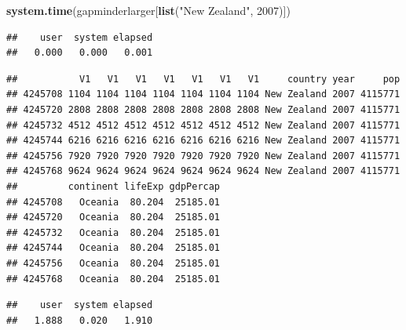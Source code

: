 \documentclass[]{article}
\newenvironment{Shaded}{\begin{snugshade}}{\end{snugshade}}
\newcommand{\KeywordTok}[1]{\textcolor[rgb]{0.13,0.29,0.53}{\textbf{{#1}}}}
\newcommand{\DecValTok}[1]{\textcolor[rgb]{0.00,0.00,0.81}{{#1}}}
\newcommand{\StringTok}[1]{\textcolor[rgb]{0.31,0.60,0.02}{{#1}}}
\newcommand{\NormalTok}[1]{{#1}}
\begin{document}
\begin{Shaded}
\begin{Highlighting}[]
\KeywordTok{system.time}\NormalTok{(gapminderlarger[}\KeywordTok{list}\NormalTok{(}\StringTok{"New Zealand"}\NormalTok{, }\DecValTok{2007}\NormalTok{)])}
\end{Highlighting}
\end{Shaded}

\begin{verbatim}
##    user  system elapsed 
##   0.000   0.000   0.001
\end{verbatim}

\begin{Shaded}
\end{Shaded}

\begin{verbatim}
##           V1   V1   V1   V1   V1   V1   V1     country year     pop
## 4245708 1104 1104 1104 1104 1104 1104 1104 New Zealand 2007 4115771
## 4245720 2808 2808 2808 2808 2808 2808 2808 New Zealand 2007 4115771
## 4245732 4512 4512 4512 4512 4512 4512 4512 New Zealand 2007 4115771
## 4245744 6216 6216 6216 6216 6216 6216 6216 New Zealand 2007 4115771
## 4245756 7920 7920 7920 7920 7920 7920 7920 New Zealand 2007 4115771
## 4245768 9624 9624 9624 9624 9624 9624 9624 New Zealand 2007 4115771
##         continent lifeExp gdpPercap
## 4245708   Oceania  80.204  25185.01
## 4245720   Oceania  80.204  25185.01
## 4245732   Oceania  80.204  25185.01
## 4245744   Oceania  80.204  25185.01
## 4245756   Oceania  80.204  25185.01
## 4245768   Oceania  80.204  25185.01
\end{verbatim}

\begin{Shaded}
\end{Shaded}

\begin{verbatim}
##    user  system elapsed 
##   1.888   0.020   1.910
\end{verbatim}
\end{document}

